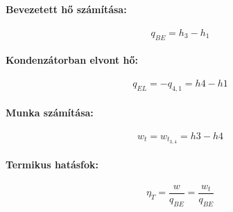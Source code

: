 \paragraph{Bevezetett hő számítása:}
	\begin{equation}
		q_{BE} = h_3 - h_1
	\end{equation}
\paragraph{Kondenzátorban elvont hő:}
	\begin{equation}
		q_{EL} = - q_{4,1} = h4 - h1
	\end{equation}
\paragraph{Munka számítása:}
	\begin{equation}
		w_t = w_{t_{3,4}} = h3-h4
	\end{equation}
\paragraph{Termikus hatásfok:}
	\begin{equation}
		\eta_T = \frac{w}{q_{BE}} = \frac{w_t}{q_{BE}}
	\end{equation}